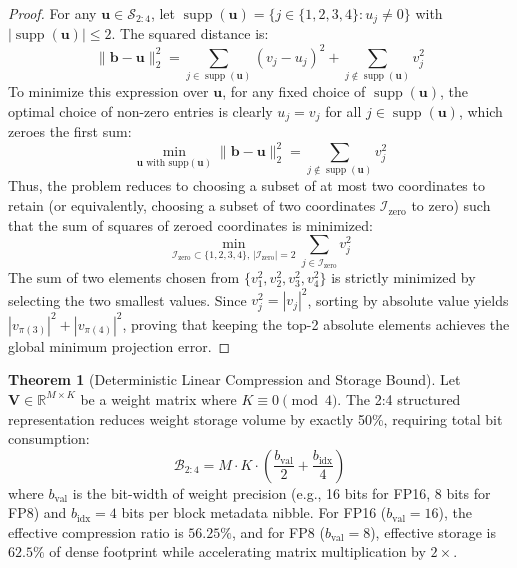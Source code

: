 \documentclass[11pt,a4paper]{article}
\theoremstyle{definition}
\newtheorem{theorem}{\textbf{Theorem}}[section]
\begin{document}
\begin{proof}
For any $\mathbf{u} \in \mathcal{S}_{2:4}$, let $\operatorname{supp}(\mathbf{u}) = \{j \in \{1, 2, 3, 4\} : u_j \neq 0\}$ with $|\operatorname{supp}(\mathbf{u})| \le 2$.
The squared distance is:
\begin{equation}
\|\mathbf{b} - \mathbf{u}\|_2^2 = \sum_{j \in \operatorname{supp}(\mathbf{u})} (v_j - u_j)^2 + \sum_{j \notin \operatorname{supp}(\mathbf{u})} v_j^2
\end{equation}
To minimize this expression over $\mathbf{u}$, for any fixed choice of $\operatorname{supp}(\mathbf{u})$, the optimal choice of non-zero entries is clearly $u_j = v_j$ for all $j \in \operatorname{supp}(\mathbf{u})$, which zeroes the first sum:
\begin{equation}
\min_{\mathbf{u} \text{ with supp}(\mathbf{u})} \|\mathbf{b} - \mathbf{u}\|_2^2 = \sum_{j \notin \operatorname{supp}(\mathbf{u})} v_j^2
\end{equation}
Thus, the problem reduces to choosing a subset of at most two coordinates to retain (or equivalently, choosing a subset of two coordinates $\mathcal{I}_{\text{zero}}$ to zero) such that the sum of squares of zeroed coordinates is minimized:
\begin{equation}
\min_{\mathcal{I}_{\text{zero}} \subset \{1, 2, 3, 4\}, \, |\mathcal{I}_{\text{zero}}| = 2} \sum_{j \in \mathcal{I}_{\text{zero}}} v_j^2
\end{equation}
The sum of two elements chosen from $\{v_1^2, v_2^2, v_3^2, v_4^2\}$ is strictly minimized by selecting the two smallest values. Since $v_j^2 = |v_j|^2$, sorting by absolute value yields $|v_{\pi(3)}|^2 + |v_{\pi(4)}|^2$, proving that keeping the top-2 absolute elements achieves the global minimum projection error.
\end{proof}

\begin{theorem}[Deterministic Linear Compression and Storage Bound]
Let $\mathbf{V} \in \mathbb{R}^{M \times K}$ be a weight matrix where $K \equiv 0 \pmod 4$. The 2:4 structured representation reduces weight storage volume by exactly 50\%, requiring total bit consumption:
{\boldmath
\begin{equation}
\mathcal{B}_{2:4} = M \cdot K \cdot \left( \frac{b_{\text{val}}}{2} + \frac{b_{\text{idx}}}{4} \right)
\end{equation}
}
where $b_{\text{val}}$ is the bit-width of weight precision (e.g., 16 bits for FP16, 8 bits for FP8) and $b_{\text{idx}} = 4$ bits per block metadata nibble. For FP16 ($b_{\text{val}}=16$), the effective compression ratio is $56.25\%$, and for FP8 ($b_{\text{val}}=8$), effective storage is $62.5\%$ of dense footprint while accelerating matrix multiplication by $2\times$.
\end{theorem}
\end{document}
